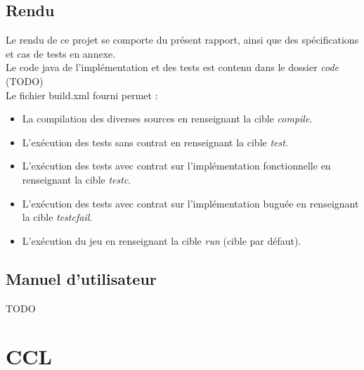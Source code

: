\documentclass[a4paper, 11pt, notitlepage]{article}
\begin{document}
\subsection{Rendu}

Le rendu de ce projet se comporte du présent rapport, ainsi que des spécifications et cas de tests en annexe. \\
Le code java de l'implémentation et des tests est contenu dans le dossier \emph{code} (TODO) \\

Le fichier build.xml fourni permet : \\

\begin{itemize}
\item La compilation des diverses sources en renseignant la cible \emph{compile}.  \\
\item L'exécution des tests sans contrat en renseignant la cible \emph{test}. \\
\item L'exécution des tests avec contrat sur l'implémentation fonctionnelle en renseignant la cible \emph{testc}. \\
\item L'exécution des tests avec contrat sur l'implémentation buguée en renseignant la cible \emph{testcfail}. \\
\item L'exécution du jeu en renseignant la cible \emph{run} (cible par défaut).\\
\end{itemize}


\subsection{Manuel d'utilisateur}

TODO



\section*{CCL}

























\newpage
\pagestyle{empty}


\newpage
\pagestyle{empty}

\end{document}
